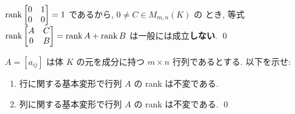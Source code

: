 \documentclass[12pt,twoside]{jarticle}
\begin{document}
\begin{rem}
  $\mathop{\mathrm{rank}}\nolimits
  \begin{bmatrix}
    0 & 1 \\
    0 & 0 \\
  \end{bmatrix} = 1$ であるから, $0\ne C\in M_{m,n}(K)$ の
  とき, 等式 $\mathop{\mathrm{rank}}\nolimits
  \begin{bmatrix}
    A & C \\
    0 & B \\
  \end{bmatrix} = \mathop{\mathrm{rank}}\nolimits A + \mathop{\mathrm{rank}}\nolimits B$ は一般には成立{\bf しない}. \qed
\end{rem}


\begin{question}
  \label{q:inv-rank}
  $A=[a_{ij}]$ は体 $K$ の元を成分に持つ $m\times n$ 行列であるとする.
  以下を示せ:
  \begin{enumerate}
  \item 行に関する基本変形で行列 $A$ の rank は不変である.
  \item 列に関する基本変形で行列 $A$ の rank は不変である.
    \qed
  \end{enumerate}
\end{question}
\end{document}
